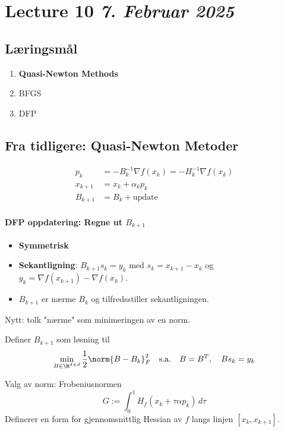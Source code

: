 \clearpage

\section{Lecture 10 \emph{7. Februar 2025}}

\subsection*{Læringsmål}
\begin{enumerate}
	\item \textbf{Quasi-Newton Methods}
	\item BFGS
	\item DFP
\end{enumerate}

\subsection*{Fra tidligere: Quasi-Newton Metoder}
\begin{align*}
	p_k     & = -B_k^{-1} \nabla f(x_k) = -H_k^{-1} \nabla f(x_k) \\
	x_{k+1} & = x_k + \alpha_k p_k                                \\
	B_{k+1} & = B_k + \text{update}
\end{align*}

\paragraph{DFP oppdatering: Regne ut \(B_{k+1}\)}
\begin{itemize}
	\item \textbf{Symmetrisk}
	\item \textbf{Sekantligning}: \(B_{k+1} s_k = y_k\) med \(s_k = x_{k+1} - x_k\) og \(y_k = \nabla f(x_{k+1}) - \nabla f(x_k)\).
	\item \(B_{k+1}\) er nærme \(B_k\) og tilfredsstiller sekantligningen.
\end{itemize}

Nytt: tolk "nærme" som minimeringen av en norm.

Definer \( B_{k+1} \) som løsning til
\[
	\min_{B \in \R^{d \times d}} \frac{1}{2} \norm{B - B_k}_F^2 \quad \text{s.a.} \quad B = B^T, \quad B s_k = y_k
\]

Valg av norm: Frobeniusnormen
\[
	G := \int_0^1 H_f(x_k + \tau \alpha p_k) \, d\tau
\]
Definerer en form for gjennomsnittlig Hessian av \( f \) langs linjen \([x_k, x_{k+1}]\).

